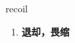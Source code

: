 
\begin{frame}
{\huge recoil}
\begin{center}
\begin{enumerate}\Large
  \item \textbf{退却，畏缩}
\end{enumerate}
\end{center}
\end{frame}
